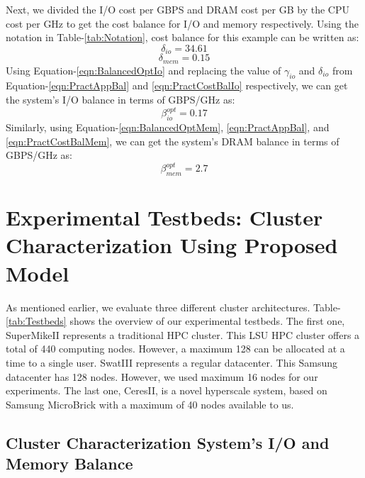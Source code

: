 \documentclass[journal]{IEEEtran}
\begin{document}
Next, we divided the I/O cost per GBPS  and DRAM cost per GB by the CPU cost per GHz to get the cost balance for I/O and memory respectively. Using the notation in Table-\ref{tab:Notation}, cost balance for this example can be written as: 
\begin{equation} \label{eqn:PractCostBalIo}
\delta_{io} = 34.61 
\end{equation}
\begin{equation} \label{eqn:PractCostBalMem}
\delta_{mem} = 0.15
\end{equation}
Using Equation-\ref{eqn:BalancedOptIo} and replacing the value of $\gamma_{io}$ and $\delta_{io}$ from Equation-\ref{eqn:PractAppBal} and \ref{eqn:PractCostBalIo} respectively, we can get the system's I/O balance in terms of GBPS/GHz as:
\begin{equation} \label{eqn:PractSysBalIo}
\beta_{io}^{opt} = 0.17
\end{equation}
Similarly, using Equation-\ref{eqn:BalancedOptMem}, \ref{eqn:PractAppBal}, and \ref{eqn:PractCostBalMem}, we can get the system's DRAM balance in terms of GBPS/GHz as:
\begin{equation} \label{eqn:PractSysBalMem}
\beta_{mem}^{opt} = 2.7
\end{equation} 

\section{Experimental Testbeds: Cluster Characterization Using Proposed Model} \label{sec:ExperimentalTestbed}
As mentioned earlier, we evaluate three different cluster architectures. Table-\ref{tab:Testbeds} shows the overview of our experimental testbeds. The first one, SuperMikeII represents a traditional HPC cluster. This LSU HPC cluster offers a total of 440 computing nodes. However, a maximum 128 can be allocated at a time to a single user. SwatIII represents a regular datacenter. This Samsung datacenter has 128 nodes. However, we used maximum 16 nodes for our experiments. The last one, CeresII, is a novel hyperscale system, based on Samsung MicroBrick with a maximum of 40 nodes available to us.

\subsection{Cluster Characterization System's I/O and Memory Balance}
\end{document}
